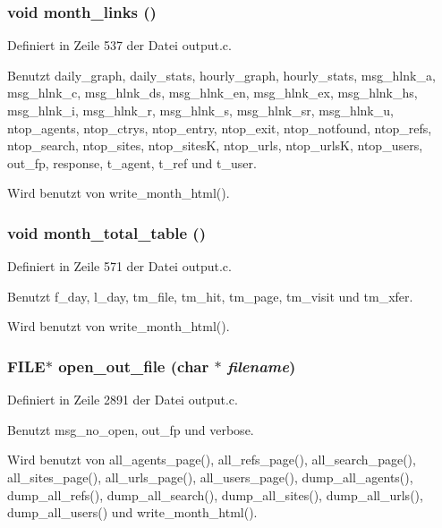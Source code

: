 \subsubsection{\setlength{\rightskip}{0pt plus 5cm}void month\_\-links ()}\label{output_8c_88fc4fa78dab50f356e5daebd1c0efcb}




Definiert in Zeile 537 der Datei output.c.

Benutzt daily\_\-graph, daily\_\-stats, hourly\_\-graph, hourly\_\-stats, msg\_\-hlnk\_\-a, msg\_\-hlnk\_\-c, msg\_\-hlnk\_\-ds, msg\_\-hlnk\_\-en, msg\_\-hlnk\_\-ex, msg\_\-hlnk\_\-hs, msg\_\-hlnk\_\-i, msg\_\-hlnk\_\-r, msg\_\-hlnk\_\-s, msg\_\-hlnk\_\-sr, msg\_\-hlnk\_\-u, ntop\_\-agents, ntop\_\-ctrys, ntop\_\-entry, ntop\_\-exit, ntop\_\-notfound, ntop\_\-refs, ntop\_\-search, ntop\_\-sites, ntop\_\-sites\-K, ntop\_\-urls, ntop\_\-urls\-K, ntop\_\-users, out\_\-fp, response, t\_\-agent, t\_\-ref und t\_\-user.

Wird benutzt von write\_\-month\_\-html().
\subsubsection{\setlength{\rightskip}{0pt plus 5cm}void month\_\-total\_\-table ()}\label{output_8c_f2c834f471b87d6264d3694c8257382c}




Definiert in Zeile 571 der Datei output.c.

Benutzt f\_\-day, l\_\-day, tm\_\-file, tm\_\-hit, tm\_\-page, tm\_\-visit und tm\_\-xfer.

Wird benutzt von write\_\-month\_\-html().
\subsubsection{\setlength{\rightskip}{0pt plus 5cm}FILE$\ast$ open\_\-out\_\-file (char $\ast$ {\em filename})}\label{output_8c_837e8afa754fafe8bf3e4e71da7db321}




Definiert in Zeile 2891 der Datei output.c.

Benutzt msg\_\-no\_\-open, out\_\-fp und verbose.

Wird benutzt von all\_\-agents\_\-page(), all\_\-refs\_\-page(), all\_\-search\_\-page(), all\_\-sites\_\-page(), all\_\-urls\_\-page(), all\_\-users\_\-page(), dump\_\-all\_\-agents(), dump\_\-all\_\-refs(), dump\_\-all\_\-search(), dump\_\-all\_\-sites(), dump\_\-all\_\-urls(), dump\_\-all\_\-users() und write\_\-month\_\-html().
